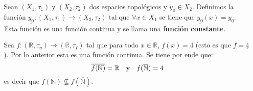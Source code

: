 \documentclass[12pt]{report}
\theoremstyle{largebreak}
\newcommand\cf[3]{\ensuremath{#1:#2\rightarrow#3}}
\newcommand{\Cls}[1]{\ensuremath{\overline{#1}}}
\begin{document}
    \begin{exa}
        Sean $(X_1,\tau_1)$ y $(X_2,\tau_2)$ dos espacios topológicos y $y_0\in X_2$. Definimos la función $\cf{\underline{y_0}}{(X_1,\tau_1)}{(X_2,\tau_2)}$ tal que $\forall x\in X_1$ se tiene que $\underline{y_0}(x)=y_0$. Esta función es una función continua y se llama una \textbf{función constante}.

        Sea $\cf{f}{(\mathbb{R},\tau_u)}{(\mathbb{R},\tau_I)}$ tal que para todo $x\in\mathbb{R}$, $f(x)=4$ (esto es que $f=\underline{4}$). Por lo anterior esta es una función continua. Se tiene por ende que:
        \begin{equation*}
            \Cls{f(\mathbb{N})}=\mathbb{R}\quad\textup{y}\quad f(\Cls{\mathbb{N}})=4
        \end{equation*}
        es decir que $\Cls{f(\mathbb{N})}\nsubseteq f(\Cls{\mathbb{N}})$.
    \end{exa}
\end{document}
